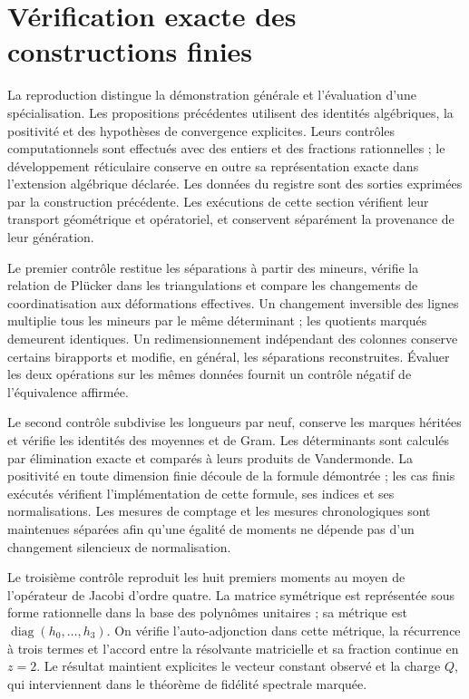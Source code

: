 \section{Vérification exacte des constructions finies}
\label{sec:exact-reproduction}

La reproduction distingue la démonstration générale et l'évaluation d'une spécialisation. Les propositions précédentes utilisent des identités algébriques, la positivité et des hypothèses de convergence explicites. Leurs contrôles computationnels sont effectués avec des entiers et des fractions rationnelles ; le développement réticulaire conserve en outre sa représentation exacte dans l'extension algébrique déclarée. Les données du registre sont des sorties exprimées par la construction précédente. Les exécutions de cette section vérifient leur transport géométrique et opératoriel, et conservent séparément la provenance de leur génération.

Le premier contrôle restitue les séparations à partir des mineurs, vérifie la relation de Plücker dans les triangulations et compare les changements de coordinatisation aux déformations effectives. Un changement inversible des lignes multiplie tous les mineurs par le même déterminant ; les quotients marqués demeurent identiques. Un redimensionnement indépendant des colonnes conserve certains birapports et modifie, en général, les séparations reconstruites. Évaluer les deux opérations sur les mêmes données fournit un contrôle négatif de l'équivalence affirmée.

Le second contrôle subdivise les longueurs par neuf, conserve les marques héritées et vérifie les identités des moyennes et de Gram. Les déterminants sont calculés par élimination exacte et comparés à leurs produits de Vandermonde. La positivité en toute dimension finie découle de la formule démontrée ; les cas finis exécutés vérifient l'implémentation de cette formule, ses indices et ses normalisations. Les mesures de comptage et les mesures chronologiques sont maintenues séparées afin qu'une égalité de moments ne dépende pas d'un changement silencieux de normalisation.

Le troisième contrôle reproduit les huit premiers moments au moyen
de l’opérateur de Jacobi d’ordre quatre. La matrice symétrique est
représentée sous forme rationnelle dans la base des polynômes unitaires ;
sa métrique est \(\operatorname{diag}(h_0,\ldots,h_3)\). On
vérifie l’auto-adjonction dans cette métrique, la récurrence à trois
termes et l’accord entre la résolvante matricielle et sa fraction
continue en \(z=2\). Le résultat maintient explicites le vecteur
constant observé et la charge \(Q\), qui interviennent dans le
théorème de fidélité spectrale marquée.

